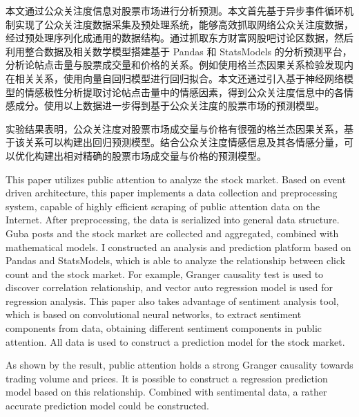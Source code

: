 \begin{cabstract}
  本文通过公众关注度信息对股票市场进行分析预测。本文首先基于异步事件循环机制实现了公众关注度数据采集及预处理系统，能够高效抓取网络公众关注度数据，经过预处理序列化成通用的数据结构。通过抓取东方财富网股吧讨论区数据，然后利用整合数据及相关数学模型搭建基于 Pandas 和 StatsModels 的分析预测平台，分析论帖点击量与股票成交量和价格的关系。例如使用格兰杰因果关系检验发现内在相关关系，使用向量自回归模型进行回归拟合。本文还通过引入基于神经网络模型的情感极性分析提取讨论帖点击量中的情感因素，得到公众关注度信息中的各情感成分。使用以上数据进一步得到基于公众关注度的股票市场的预测模型。

  实验结果表明，公众关注度对股票市场成交量与价格有很强的格兰杰因果关系，基于该关系可以构建出回归预测模型。结合公众关注度情感信息及其各情感分量，可以优化构建出相对精确的股票市场成交量与价格的预测模型。
\end{cabstract}


\begin{eabstract}
  This paper utilizes public attention to analyze the stock market. Based on event driven architecture, this paper implements a data collection and preprocessing system, capable of highly efficient scraping of public attention data on the Internet. After preprocessing, the data is serialized into general data structure. Guba posts and the stock market are collected and aggregated, combined with mathematical models. I constructed an analysis and prediction platform based on Pandas and StatsModels, which is able to analyze the relationship between click count and the stock market. For example, Granger causality test is used to discover correlation relationship, and vector auto regression model is used for regression analysis. This paper also takes advantage of sentiment analysis tool, which is based on convolutional neural networks, to extract sentiment components from data, obtaining different sentiment components in public attention. All data is used to construct a prediction model for the stock market.

  As shown by the result, public attention holds a strong Granger causality towards trading volume and prices. It is possible to construct a regression prediction model based on this relationship. Combined with sentimental data, a rather accurate prediction model could be constructed.
\end{eabstract}

